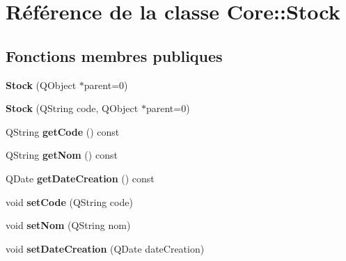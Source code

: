 \hypertarget{class_core_1_1_stock}{
\section{Référence de la classe Core::Stock}
\label{d6/d24/class_core_1_1_stock}
}
\subsection*{Fonctions membres publiques}
\begin{DoxyCompactItemize}
\item 
\hypertarget{class_core_1_1_stock_a7e43366f550c98967452b84b38f5a13e}{
{\bfseries Stock} (QObject $\ast$parent=0)}
\label{d6/d24/class_core_1_1_stock_a7e43366f550c98967452b84b38f5a13e}

\item 
\hypertarget{class_core_1_1_stock_a3649191630c111a52193c1fd9d7b49a6}{
{\bfseries Stock} (QString code, QObject $\ast$parent=0)}
\label{d6/d24/class_core_1_1_stock_a3649191630c111a52193c1fd9d7b49a6}

\item 
\hypertarget{class_core_1_1_stock_ad2ce1820273694d0489070011523c8f2}{
QString {\bfseries getCode} () const }
\label{d6/d24/class_core_1_1_stock_ad2ce1820273694d0489070011523c8f2}

\item 
\hypertarget{class_core_1_1_stock_a58368d4a798eddf98bcc9f569a98bb38}{
QString {\bfseries getNom} () const }
\label{d6/d24/class_core_1_1_stock_a58368d4a798eddf98bcc9f569a98bb38}

\item 
\hypertarget{class_core_1_1_stock_a4252cfe8c43d71b0445100f4fe63f71d}{
QDate {\bfseries getDateCreation} () const }
\label{d6/d24/class_core_1_1_stock_a4252cfe8c43d71b0445100f4fe63f71d}

\item 
\hypertarget{class_core_1_1_stock_a4b66ba01a2da6ec009a28c56f414a5f2}{
void {\bfseries setCode} (QString code)}
\label{d6/d24/class_core_1_1_stock_a4b66ba01a2da6ec009a28c56f414a5f2}

\item 
\hypertarget{class_core_1_1_stock_a60200b3fe0f0e056fd1a145b78c8b221}{
void {\bfseries setNom} (QString nom)}
\label{d6/d24/class_core_1_1_stock_a60200b3fe0f0e056fd1a145b78c8b221}

\item 
\hypertarget{class_core_1_1_stock_a3621ce64a24b1abe3867e6772f8eae7f}{
void {\bfseries setDateCreation} (QDate dateCreation)}
\label{d6/d24/class_core_1_1_stock_a3621ce64a24b1abe3867e6772f8eae7f}

\end{DoxyCompactItemize}
